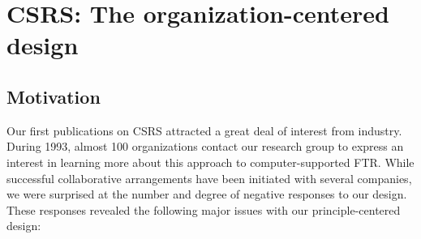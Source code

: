 
\section{CSRS: The organization-centered design}

\subsection{Motivation}

Our first publications on CSRS attracted a great deal of interest from
industry.  During 1993, almost 100 organizations contact our research group
to express an interest in learning more about this approach to
computer-supported FTR.  While successful collaborative arrangements have
been initiated with several companies, we were surprised at the number and
degree of negative responses to our design.  These responses revealed the
following major issues with our principle-centered design:

